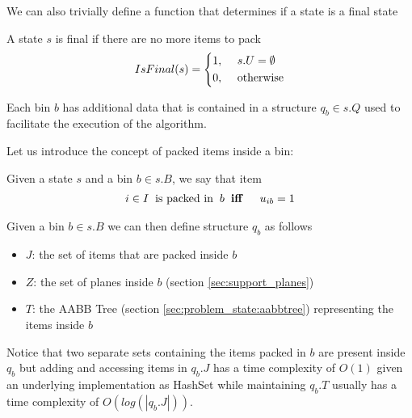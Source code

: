 We can also trivially define a function that determines if a state is a final state
\begin{definition}
    \label{def:state_final}
    A state $s$ is final if there are no more items to pack
    \begin{equation}
        \label{algo:state_final}%
        IsFinal(s) = \left\{\begin{aligned}
            1,\hspace{0.5cm}& s.U = \emptyset \\
            0,\hspace{0.5cm}& \text{otherwise}
        \end{aligned}
        \right.
    \end{equation}
\end{definition}

Each bin $b$ has additional data that is contained in a structure $q_b \in s.Q$ used to facilitate the execution of the algorithm. 

Let us introduce the concept of packed items inside a bin:
\begin{definition}
    Given a state $s$ and a bin $b \in s.B$, we say that item
    \begin{equation*}
        \begin{aligned}
            i \in I \hspace{.2cm}\text{is packed in} \hspace{.2cm}b \hspace{.2cm}& \textbf{iff} \hspace{.2cm}& u_{ib} = 1
        \end{aligned}
    \end{equation*}
\end{definition}

Given a bin $b \in s.B$ we can then define structure $q_b$ as follows
\begin{itemize}
    \item $J$: the set of items that are packed inside $b$
    \item $Z$: the set of planes inside $b$ (section \ref{sec:support_planes})
    \item $T$: the AABB Tree (section \ref{sec:problem_state:aabbtree}) representing the items inside $b$
\end{itemize}

Notice that two separate sets containing the items packed in $b$ are present inside $q_b$ but adding and accessing items in $q_b.J$ has a time complexity of $O(1)$ given an underlying implementation as HashSet while maintaining $q_b.T$ usually has a time complexity of $O(log(|q_b.J|))$.

